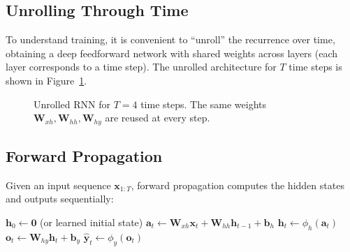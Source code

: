 \documentclass{tufte-handout}
\begin{document}
\subsection{Unrolling Through Time}

To understand training, it is convenient to “unroll” the recurrence over time, obtaining a deep feedforward network with shared weights across layers (each layer corresponds to a time step). The unrolled architecture for $T$ time steps is shown in Figure~\ref{fig:rnn_unrolled}.

\begin{figure}[h]
\centering
{}
\caption{Unrolled RNN for $T=4$ time steps. The same weights $\mathbf{W}_{xh}, \mathbf{W}_{hh}, \mathbf{W}_{hy}$ are reused at every step.}
\label{fig:rnn_unrolled}
\end{figure}

\subsection{Forward Propagation}

Given an input sequence $\mathbf{x}_{1:T}$, forward propagation computes the hidden states and outputs sequentially:

\begin{algorithm}[h]
    \caption{Forward pass of an RNN}
    \begin{algorithmic}[1]
        \State $\mathbf{h}_0 \gets \mathbf{0}$ (or learned initial state)
            \State $\mathbf{a}_t \gets \mathbf{W}_{xh}\mathbf{x}_t + \mathbf{W}_{hh}\mathbf{h}_{t-1} + \mathbf{b}_h$
            \State $\mathbf{h}_t \gets \phi_h(\mathbf{a}_t)$
            \State $\mathbf{o}_t \gets \mathbf{W}_{hy}\mathbf{h}_t + \mathbf{b}_y$
            \State $\hat{\mathbf{y}}_t \gets \phi_y(\mathbf{o}_t)$
        \EndFor
    \end{algorithmic}
\end{algorithm}
\end{document}
